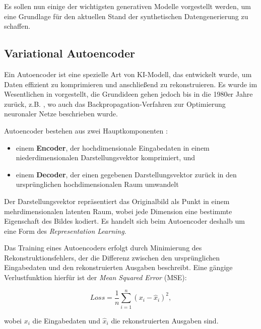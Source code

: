 Es sollen nun einige der wichtigsten generativen Modelle vorgestellt werden, um eine Grundlage für den aktuellen Stand der synthetischen Datengenerierung zu schaffen.


\subsection{Variational Autoencoder} \label{sec:vae}

Ein Autoencoder ist eine spezielle Art von KI-Modell, das entwickelt wurde, um Daten effizient zu komprimieren und anschließend zu rekonstruieren. Es wurde im Wesentlichen in \parencite{Hinton2006autoencoder} vorgestellt, die Grundideen gehen jedoch bis in die 1980er Jahre zurück, z.B. \parencite{Rumelhart1986backpropagation}, wo auch das Backpropagation-Verfahren zur Optimierung neuronaler Netze beschrieben wurde.

Autoencoder bestehen aus zwei Hauptkomponenten \parencite{Foster2020gendeeplearning}:

\begin{itemize}
	\item einem \textbf{Encoder}, der hochdimensionale Eingabedaten in einem niederdimensionalen Darstellungsvektor komprimiert, und
	\item einem \textbf{Decoder}, der einen gegebenen Darstellungsvektor zurück in den ursprünglichen hochdimensionalen Raum umwandelt
\end{itemize}

Der Darstellungsvektor repräsentiert das Originalbild als Punkt in einem mehrdimensionalen latenten Raum, wobei jede Dimension eine bestimmte Eigenschaft des Bildes kodiert. Es handelt sich beim Autoencoder deshalb um eine Form des \textit{Representation Learning}.

Das Training eines Autoencoders erfolgt durch Minimierung des Rekonstruktionsfehlers, der die Differenz zwischen den ursprünglichen Eingabedaten und den rekonstruierten Ausgaben beschreibt. Eine gängige Verlustfunktion hierfür ist der \textit{Mean Squared Error} (MSE):

\begin{equation}
	Loss=\frac{1}{n}\sum_{i=1}^n (x_i-\hat{x}_i)^2,
	\label{eq:loss-mse}
\end{equation}

wobei $x_i$ die Eingabedaten und $\hat{x}_i$ die rekonstruierten Ausgaben sind.

